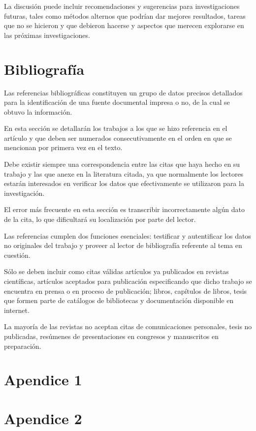 \documentclass[%
 reprint,
groupedaddress,
unsortedaddress,
 amsmath,amssymb,
 aps,
superscriptaddress
]{revtex4-2}
\begin{document}
La discusión puede incluir recomendaciones y sugerencias para investigaciones futuras, 
tales como métodos alternos que podrían dar mejores resultados, tareas que no se hicieron 
y que debieron hacerse y aspectos que merecen explorarse en las próximas investigaciones.

\section{Bibliografía}

Las referencias bibliográficas constituyen un grupo de datos precisos detallados para la 
identificación de una fuente documental impresa o no, de la cual se obtuvo la información.

En esta sección se detallarán los trabajos a los que se hizo referencia en el artículo y 
que deben ser numerados consecutivamente en el orden en que se mencionan por primera vez 
en el texto.

Debe existir siempre una correspondencia entre las citas que haya hecho en su trabajo y 
las que anexe en la literatura citada, ya que normalmente los lectores estarán 
interesados en verificar los datos que efectivamente se utilizaron para la investigación.

El error más frecuente en esta sección es transcribir incorrectamente algún dato de la 
cita, lo que dificultará su localización por parte del lector.

Las referencias cumplen dos funciones esenciales: testificar y autentificar los datos no 
originales del trabajo y proveer al lector de bibliografía referente al tema en cuestión.

Sólo se deben incluir como citas válidas artículos ya publicados en revistas científicas, 
artículos aceptados para publicación especificando que dicho trabajo se encuentra en 
prensa o en proceso de publicación; libros, capítulos de libros, tesis que formen parte 
de catálogos de bibliotecas y documentación disponible en internet.

La mayoría de las revistas no aceptan citas de comunicaciones personales, tesis no 
publicadas, resúmenes de presentaciones en congresos y manuscritos en preparación.



\appendix
\section*{Apendice 1}

\section*{Apendice 2}
\end{document}
